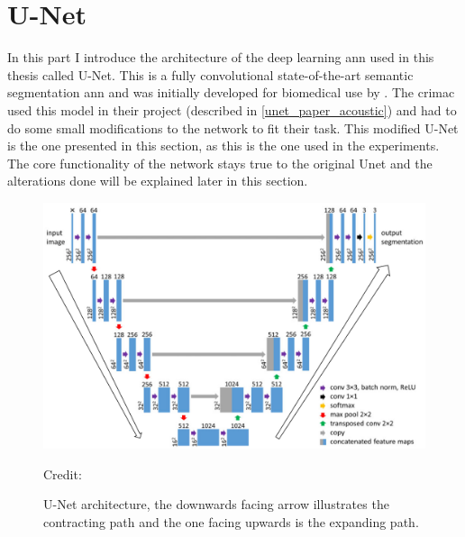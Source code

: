     

\section{U-Net}
    In this part I introduce the architecture of the deep learning \gls{ann} used in this thesis called U-Net. This is a fully convolutional state-of-the-art\cite{rajak2021segmentation} semantic segmentation \gls{ann} and was initially developed for biomedical use by \citeauthor{unet_ronneberger2015}\cite{unet_ronneberger2015}. The \gls{crimac} used this model in their project (described in \ref{unet_paper_acoustic}) and had to do some small modifications to the network to fit their task. This modified U-Net is the one presented in this section, as this is the one used in the experiments. The core functionality of the network stays true to the original Unet and the alterations done will be explained later in this section.
    
    \begin{figure}[H]
        \centering
        \includegraphics[scale=0.5]{figures/unet_arrows.png}
        \caption{U-Net architecture, the downwards facing arrow illustrates the contracting path and the one facing upwards is the expanding path.}
      	\medskip 
        \label{unet_fig}
        \hspace*{15pt}\hbox{\scriptsize Credit: \citeauthor{brautaset2020acoustic}\cite{brautaset2020acoustic}}
    \end{figure}
    
